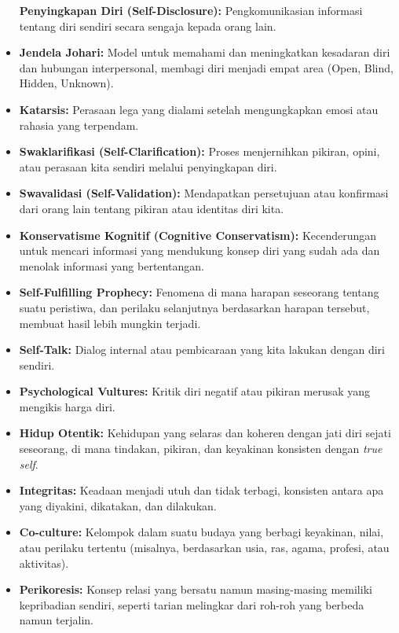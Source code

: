 \documentclass[
  letterpaper,
  DIV=11,
  numbers=noendperiod]{scrreprt}
\begin{document}
\begin{itemize}
  \textbf{Penyingkapan Diri (Self-Disclosure):} Pengkomunikasian
  informasi tentang diri sendiri secara sengaja kepada orang lain.
\item
  \textbf{Jendela Johari:} Model untuk memahami dan meningkatkan
  kesadaran diri dan hubungan interpersonal, membagi diri menjadi empat
  area (Open, Blind, Hidden, Unknown).
\item
  \textbf{Katarsis:} Perasaan lega yang dialami setelah mengungkapkan
  emosi atau rahasia yang terpendam.
\item
  \textbf{Swaklarifikasi (Self-Clarification):} Proses menjernihkan
  pikiran, opini, atau perasaan kita sendiri melalui penyingkapan diri.
\item
  \textbf{Swavalidasi (Self-Validation):} Mendapatkan persetujuan atau
  konfirmasi dari orang lain tentang pikiran atau identitas diri kita.
\item
  \textbf{Konservatisme Kognitif (Cognitive Conservatism):}
  Kecenderungan untuk mencari informasi yang mendukung konsep diri yang
  sudah ada dan menolak informasi yang bertentangan.
\item
  \textbf{Self-Fulfilling Prophecy:} Fenomena di mana harapan seseorang
  tentang suatu peristiwa, dan perilaku selanjutnya berdasarkan harapan
  tersebut, membuat hasil lebih mungkin terjadi.
\item
  \textbf{Self-Talk:} Dialog internal atau pembicaraan yang kita lakukan
  dengan diri sendiri.
\item
  \textbf{Psychological Vultures:} Kritik diri negatif atau pikiran
  merusak yang mengikis harga diri.
\item
  \textbf{Hidup Otentik:} Kehidupan yang selaras dan koheren dengan jati
  diri sejati seseorang, di mana tindakan, pikiran, dan keyakinan
  konsisten dengan \emph{true self}.
\item
  \textbf{Integritas:} Keadaan menjadi utuh dan tidak terbagi, konsisten
  antara apa yang diyakini, dikatakan, dan dilakukan.
\item
  \textbf{Co-culture:} Kelompok dalam suatu budaya yang berbagi
  keyakinan, nilai, atau perilaku tertentu (misalnya, berdasarkan usia,
  ras, agama, profesi, atau aktivitas).
\item
  \textbf{Perikoresis:} Konsep relasi yang bersatu namun masing-masing
  memiliki kepribadian sendiri, seperti tarian melingkar dari roh-roh
  yang berbeda namun terjalin.
\end{itemize}

\end{document}
